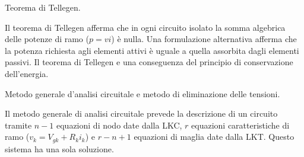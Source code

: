 \documentclass[answers, a4paper,12pt]{exam}
\begin{document}
\begin{questions}
	\question
	Teorema di Tellegen.
	\begin{solution}Il teorema di Tellegen afferma che in ogni circuito isolato la somma algebrica delle potenze di ramo ($p = vi$) è nulla. Una formulazione alternativa afferma che la potenza richiesta agli elementi attivi è uguale a quella assorbita dagli elementi passivi. Il teorema di Tellegen e una conseguenza del principio di conservazione dell'energia. \end{solution}
		
	\question
	Metodo generale d’analisi circuitale e metodo di eliminazione delle tensioni.
	\begin{solution}
		Il metodo generale di analisi circuitale prevede la descrizione di un circuito tramite $n - 1$ equazioni di nodo date dalla LKC, $r$ equazioni caratteristiche di ramo ($v_k = V_{gk} + R_k i_k$) e $r - n + 1$ equazioni di maglia date dalla LKT. Questo sistema ha una sola soluzione.
		

\end{solution}
\end{questions}
\end{document}

